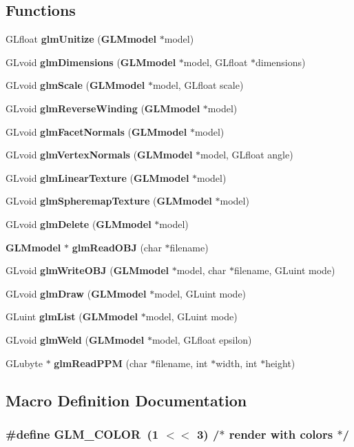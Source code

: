 \subsection*{Functions}
\begin{DoxyCompactItemize}
\item 
G\-Lfloat {\bf glm\-Unitize} ({\bf G\-L\-Mmodel} $\ast$model)
\item 
G\-Lvoid {\bf glm\-Dimensions} ({\bf G\-L\-Mmodel} $\ast$model, G\-Lfloat $\ast$dimensions)
\item 
G\-Lvoid {\bf glm\-Scale} ({\bf G\-L\-Mmodel} $\ast$model, G\-Lfloat scale)
\item 
G\-Lvoid {\bf glm\-Reverse\-Winding} ({\bf G\-L\-Mmodel} $\ast$model)
\item 
G\-Lvoid {\bf glm\-Facet\-Normals} ({\bf G\-L\-Mmodel} $\ast$model)
\item 
G\-Lvoid {\bf glm\-Vertex\-Normals} ({\bf G\-L\-Mmodel} $\ast$model, G\-Lfloat angle)
\item 
G\-Lvoid {\bf glm\-Linear\-Texture} ({\bf G\-L\-Mmodel} $\ast$model)
\item 
G\-Lvoid {\bf glm\-Spheremap\-Texture} ({\bf G\-L\-Mmodel} $\ast$model)
\item 
G\-Lvoid {\bf glm\-Delete} ({\bf G\-L\-Mmodel} $\ast$model)
\item 
{\bf G\-L\-Mmodel} $\ast$ {\bf glm\-Read\-O\-B\-J} (char $\ast$filename)
\item 
G\-Lvoid {\bf glm\-Write\-O\-B\-J} ({\bf G\-L\-Mmodel} $\ast$model, char $\ast$filename, G\-Luint mode)
\item 
G\-Lvoid {\bf glm\-Draw} ({\bf G\-L\-Mmodel} $\ast$model, G\-Luint mode)
\item 
G\-Luint {\bf glm\-List} ({\bf G\-L\-Mmodel} $\ast$model, G\-Luint mode)
\item 
G\-Lvoid {\bf glm\-Weld} ({\bf G\-L\-Mmodel} $\ast$model, G\-Lfloat epsilon)
\item 
G\-Lubyte $\ast$ {\bf glm\-Read\-P\-P\-M} (char $\ast$filename, int $\ast$width, int $\ast$height)
\end{DoxyCompactItemize}


\subsection{Macro Definition Documentation}
\subsubsection[{G\-L\-M\-\_\-\-C\-O\-L\-O\-R}]{\setlength{\rightskip}{0pt plus 5cm}\#define G\-L\-M\-\_\-\-C\-O\-L\-O\-R~(1 $<$$<$ 3)       /$\ast$ render with colors $\ast$/}\label{glm_8h_a26595ef12b96166a4bc24ffbdd5da4b1}
